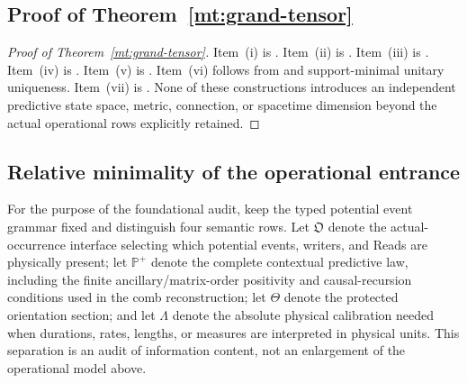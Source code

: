 \documentclass[11pt]{article}
\numberwithin{equation}{section}
\theoremstyle{definition}
\theoremstyle{remark}
\begin{document}
\subsection{Proof of Theorem~\ref{mt:grand-tensor}}

\begin{proof}[Proof of Theorem~\ref{mt:grand-tensor}]
Item~\textup{(i)} is
.  Item~\textup{(ii)}
is .  Item~\textup{(iii)} is
.  Item~\textup{(iv)} is
.  Item~\textup{(v)} is
.  Item~\textup{(vi)}
follows from 
and support-minimal unitary uniqueness.  Item~\textup{(vii)} is
.  None of these constructions
introduces an independent predictive state space, metric, connection, or
spacetime dimension beyond the actual operational rows explicitly retained.
\end{proof}

\subsection{Relative minimality of the operational entrance}
\label{subsec:supp-relative-minimality}

For the purpose of the foundational audit, keep the typed potential event
grammar fixed and distinguish four semantic rows.  Let $\mathfrak O$ denote
the actual-occurrence interface selecting which potential events, writers, and
Reads are physically present; let $\mathbb P^+$ denote the complete contextual
predictive law, including the finite ancillary/matrix-order positivity and
causal-recursion conditions used in the comb reconstruction; let $\Theta$
denote the protected orientation section; and let $\Lambda$ denote the
absolute physical calibration needed when durations, rates, lengths, or
measures are interpreted in physical units.  This separation is an audit of
information content, not an enlargement of the operational model above.
\end{document}
